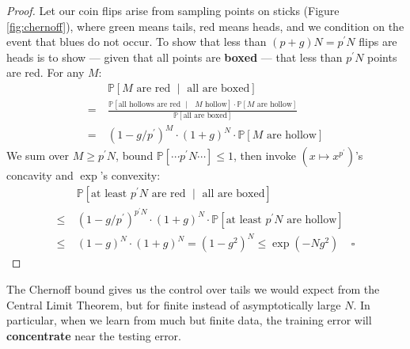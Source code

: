 \documentclass[twocolumn, 11pt]{article}
\newcommand{\PP}{\mathbb{P}}
\theoremstyle{definition}
\begin{document}
        \begin{proof} \renewcommand{\qedsymbol}{}
            Let our coin flips arise from sampling points on sticks
            (Figure \ref{fig:chernoff}), where green means tails, red
            means heads, and we condition on the event that blues do not occur.
            To show that less than $(p+g)N = p^\prime N$ flips are
            heads is to show --- given that all points are \textbf{boxed} ---
            that less than $p^\prime N$ points are red. 
            For any $M$:
            {%
            \begin{align*}
                    & ~ \PP[\text{$M$ are red $\mid$ all are boxed}] \\
                  = & ~ \frac{\PP[\text{all hollows are red $\mid$ $M$ hollow}] \cdot \PP[\text{$M$ are hollow}]}{\PP[\text{all are boxed}] } \\
                  = & ~ (1 - g/p^\prime)^{M} \cdot (1+g)^{N} \cdot \PP[\text{$M$ are hollow}]
            \end{align*}
            }%
            We sum over $M\geq p^\prime N$, bound $\PP[\cdots p^\prime N \cdots] \leq 1$,
            then invoke $(x \mapsto x^{p^\prime})$'s concavity and
            $\exp$'s convexity:
            \begin{align*}
                &~\PP[\text{at least $p^\prime N$ are red $\mid$ all are boxed}]
                \\ \leq
                &~(1 - g/p^\prime)^{p^\prime N} \cdot (1+g)^{N} \cdot \PP[\text{at least $p^\prime N$ are hollow}]
                \\ \leq
                &~(1 - g)^N \cdot (1 + g)^{N}
                =
                (1 - g^2)^N
                \leq
                \exp(- Ng^2)
                ~~~~~\square
            \end{align*}
        \end{proof}
        \vspace{-0.5cm}
        The Chernoff bound gives us the control over tails we would expect from the
        Central Limit Theorem, but for finite instead of asymptotically large
        $N$.  In particular, when we learn from much but finite data, the
        training error will \textbf{concentrate} near the testing error.
\end{document}
